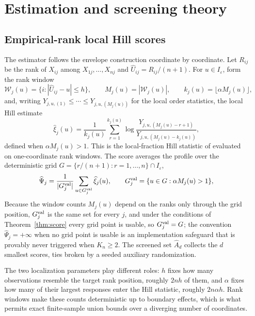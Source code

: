 \documentclass[bj,authoryear]{imsart}
\theoremstyle{plain}
\newcommand{\A}{A}\newcommand{\I}{I_\varepsilon}
\begin{document}
\section{Estimation and screening theory}\label{sec:estimation}

\subsection{Empirical-rank local Hill scores}

The estimator follows the envelope construction coordinate by coordinate.
Let $R_{ij}$ be the rank of $X_{ij}$ among $X_{1j},\ldots,X_{nj}$ and
$\widehat U_{ij}=R_{ij}/(n+1)$. For $u\in\I$, form the rank window
\[
 \mathcal W_j(u)=\{i:|\widehat U_{ij}-u|\le h\},\qquad
 M_j(u)=|\mathcal W_j(u)|,\qquad
 k_j(u)=\lfloor\alpha M_j(u)\rfloor,
\]
and, writing $Y_{j,u,(1)}\le\cdots\le Y_{j,u,(M_j(u))}$ for the local order
statistics, the local Hill estimate
\begin{equation}\label{eq:hill}
 \widehat\xi_j(u)=\frac1{k_j(u)}\sum_{r=1}^{k_j(u)}
 \log\frac{Y_{j,u,(M_j(u)-r+1)}}{Y_{j,u,(M_j(u)-k_j(u))}},
\end{equation}
defined when $\alpha M_j(u)>1$. This is the local-fraction Hill statistic of
\citet[Definition~5]{gardesPodgorny2025} evaluated on one-coordinate rank
windows. The score averages the profile over the deterministic grid
$G=\{r/(n+1):r=1,\ldots,n\}\cap\I$,
\begin{equation}\label{eq:emp-score}
 \widehat\Psi_j=\frac1{|G_j^{\rm val}|}\sum_{u\in G_j^{\rm val}}\widehat\xi_j(u),
 \qquad
 G_j^{\rm val}=\{u\in G:\alpha M_j(u)>1\},
\end{equation}
Because the window counts $M_j(u)$ depend on the ranks only through
the grid position, $G_j^{\rm val}$ is the same set for every $j$, and
under the conditions of Theorem~\ref{thm:score} every grid point is
usable, so $G_j^{\rm val}=G$; the convention $\widehat\Psi_j=+\infty$
when no grid point is usable is an implementation safeguard that is
provably never triggered when $K_n\ge2$. The screened set
$\widehat\A_d$ collects the $d$ smallest scores, ties broken by a
seeded auxiliary randomization.

The two localization parameters play different roles: $h$ fixes how many
observations resemble the target rank position, roughly $2nh$ of them, and
$\alpha$ fixes how many of their largest responses enter the Hill statistic,
roughly $2n\alpha h$. Rank windows make these counts deterministic up to
boundary effects, which is what permits exact finite-sample union bounds
over a diverging number of coordinates.
\end{document}
